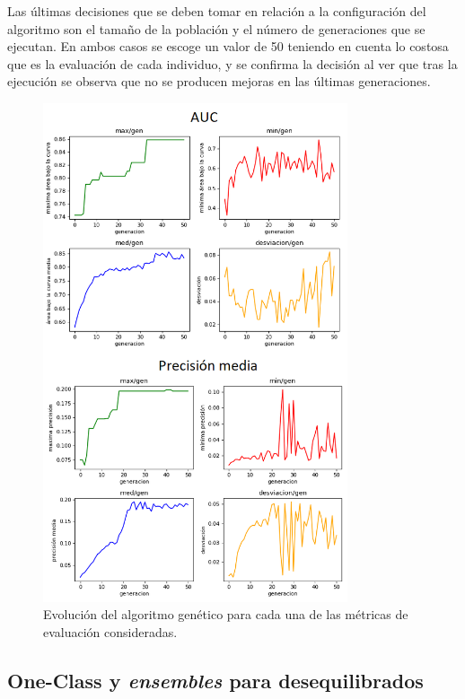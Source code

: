 Las últimas decisiones que se deben tomar en relación a la configuración del algoritmo son el tamaño de la población y el número de generaciones que se ejecutan. En ambos casos se escoge un valor de 50 teniendo en cuenta lo costosa que es la evaluación de cada individuo, y se confirma la decisión al ver que tras la ejecución se observa que no se producen mejoras en las últimas generaciones. 

\begin{figure}
	\centering
	\includegraphics[width=0.8\textwidth]{../img/genetico.png}
	\caption{Evolución del algoritmo genético para cada una de las métricas de evaluación consideradas.}
	\label{fig:genetico}
\end{figure}

\subsection{One-Class y \textit{ensembles} para desequilibrados}

